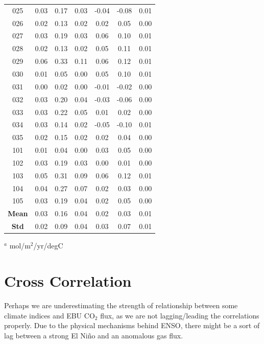\documentclass[12pt]{article}
\begin{document}
\begin{table}[!h]
\begin{tabular}{c c c c | c c c}
		025 &   0.03 &     0.17 &       0.03 &  -0.04 &    -0.08 &       0.01 \\
		026 &   0.02 &     0.13 &       0.02 &   0.02 &     0.05 &       0.00 \\
		027 &   0.03 &     0.19 &       0.03 &   0.06 &     0.10 &       0.01 \\
		028 &   0.02 &     0.13 &       0.02 &   0.05 &     0.11 &       0.01 \\
		029 &   0.06 &     0.33 &       0.11 &   0.06 &     0.12 &       0.01 \\
		030 &   0.01 &     0.05 &       0.00 &   0.05 &     0.10 &       0.01 \\
		031 &   0.00 &     0.02 &       0.00 &  -0.01 &    -0.02 &       0.00 \\
		032 &   0.03 &     0.20 &       0.04 &  -0.03 &    -0.06 &       0.00 \\
		033 &   0.03 &     0.22 &       0.05 &   0.01 &     0.02 &       0.00 \\
		034 &   0.03 &     0.14 &       0.02 &  -0.05 &    -0.10 &       0.01 \\
		035 &   0.02 &     0.15 &       0.02 &   0.02 &     0.04 &       0.00 \\
		101 &   0.01 &     0.04 &       0.00 &   0.03 &     0.05 &       0.00 \\
		102 &   0.03 &     0.19 &       0.03 &   0.00 &     0.01 &       0.00 \\
		103 &   0.05 &     0.31 &       0.09 &   0.06 &     0.12 &       0.01 \\
		104 &   0.04 &     0.27 &       0.07 &   0.02 &     0.03 &       0.00 \\
		105 &   0.03 &     0.19 &       0.04 &   0.02 &     0.05 &       0.00 \\
		\bottomrule
		\textbf{Mean} & 0.03 & 0.16 & 0.04 & 0.02 & 0.03 & 0.01 \\
		\textbf{Std} & 0.02 & 0.09 & 0.04 & 0.03 & 0.07 & 0.01
	\end{tabular}
	\begin{tablenotes}
		\centering
		\item $^{a}$ mol/m$^{2}$/yr/degC
	\end{tablenotes}
	\label{tab:pdo-atlantic}
\end{table}

\section{Cross Correlation}
Perhaps we are underestimating the strength of relationship between some climate indices and EBU CO$_{2}$ flux, as we are not lagging/leading the correlations properly. Due to the physical mechanisms behind ENSO, there might be a sort of lag between a strong El Ni\~no and an anomalous gas flux. \\
\end{document}
